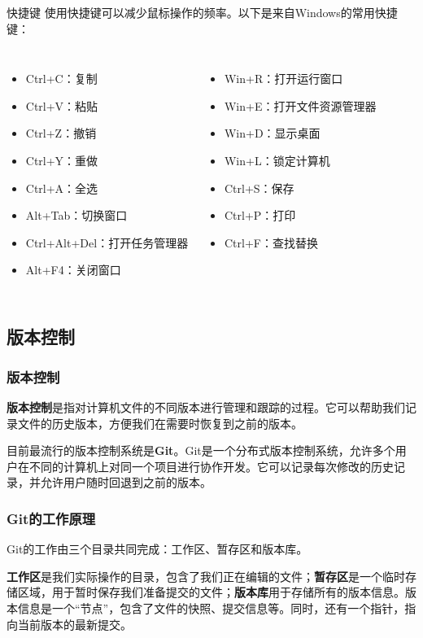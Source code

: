 \documentclass{beamer}
\begin{document}
\begin{frame}{快捷键}
    使用快捷键可以减少鼠标操作的频率。以下是来自Windows的常用快捷键：
    \begin{columns}[T]
            \begin{itemize}
                \item Ctrl+C：复制
                \item Ctrl+V：粘贴
                \item Ctrl+Z：撤销
                \item Ctrl+Y：重做
                \item Ctrl+A：全选
                \item Alt+Tab：切换窗口
                \item Ctrl+Alt+Del：打开任务管理器
                \item Alt+F4：关闭窗口
            \end{itemize}

            \begin{itemize}
                \item Win+R：打开运行窗口
                \item Win+E：打开文件资源管理器
                \item Win+D：显示桌面
                \item Win+L：锁定计算机
                \item Ctrl+S：保存
                \item Ctrl+P：打印
                \item Ctrl+F：查找替换
            \end{itemize}
    \end{columns}
\end{frame}
\subsection{版本控制}
\begin{frame}
    \frametitle{版本控制}
    \textbf{版本控制}是指对计算机文件的不同版本进行管理和跟踪的过程。它可以帮助我们记录文件的历史版本，方便我们在需要时恢复到之前的版本。

    目前最流行的版本控制系统是\textbf{Git}。Git是一个分布式版本控制系统，允许多个用户在不同的计算机上对同一个项目进行协作开发。它可以记录每次修改的历史记录，并允许用户随时回退到之前的版本。
\end{frame}

\begin{frame}
    \frametitle{Git的工作原理}
    Git的工作由三个目录共同完成：工作区、暂存区和版本库。

    \textbf{工作区}是我们实际操作的目录，包含了我们正在编辑的文件；\textbf{暂存区}是一个临时存储区域，用于暂时保存我们准备提交的文件；\textbf{版本库}用于存储所有的版本信息。版本信息是一个“节点”，包含了文件的快照、提交信息等。同时，还有一个指针，指向当前版本的最新提交。
\end{frame}
\end{document}
